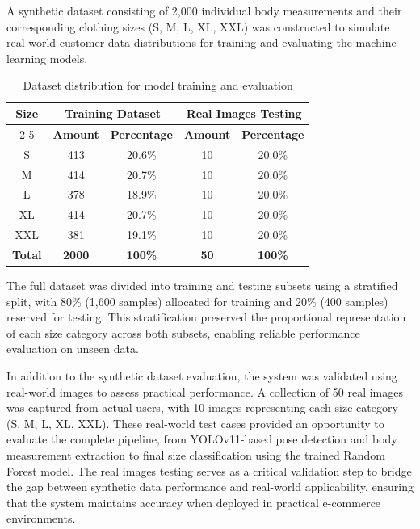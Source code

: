 \documentclass{llncs}
\begin{document}
A synthetic dataset consisting of 2,000 individual body measurements and their corresponding clothing sizes (S, M, L, XL, XXL) was constructed to simulate real-world customer data distributions for 
    training and evaluating the machine learning models.

\begin{table}[H]
\centering
\caption{Dataset distribution for model training and evaluation}
\setlength{\tabcolsep}{12pt} %
\renewcommand{\arraystretch}{1.3} %
\begin{tabular}{ccccc}
\hline
\multirow{2}{*}{\textbf{Size}} & \multicolumn{2}{c}{\textbf{Training Dataset}} & \multicolumn{2}{c}{\textbf{Real Images Testing}} \\
\cline{2-5}
& \textbf{Amount} & \textbf{Percentage} & \textbf{Amount} & \textbf{Percentage} \\
\hline\hline %
S & 413 & 20.6\% & 10 & 20.0\% \\
\hline
M & 414 & 20.7\% & 10 & 20.0\% \\
\hline
L & 378 & 18.9\% & 10 & 20.0\% \\
\hline
XL & 414 & 20.7\% & 10 & 20.0\% \\
\hline
XXL & 381 & 19.1\% & 10 & 20.0\% \\
\hline\hline %
\textbf{Total} & \textbf{2000} & \textbf{100\%} & \textbf{50} & \textbf{100\%} \\
\hline
\end{tabular}
\end{table}


The full dataset was divided into training and testing subsets using a stratified split, with 80\% (1,600 samples) allocated for training and 20\% (400 samples) reserved for testing. 
This stratification preserved the proportional representation of each size category across both subsets, enabling reliable performance evaluation on unseen data.

In addition to the synthetic dataset evaluation, the system was validated using real-world images to assess practical performance. A collection of 50 real images was captured from actual users, with 10 images representing each size category (S, M, L, XL, XXL). These real-world test cases provided an opportunity to evaluate the complete pipeline, from YOLOv11-based pose detection and body measurement extraction to final size classification using the trained Random Forest model. The real images testing serves as a critical validation step to bridge the gap between synthetic data performance and real-world applicability, ensuring that the system maintains accuracy when deployed in practical e-commerce environments.
\end{document}
